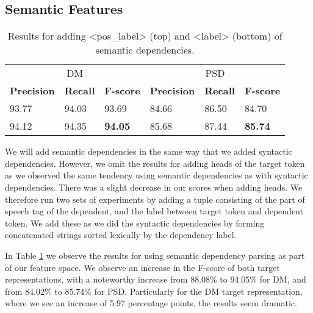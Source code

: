 

\subsection{Semantic Features}
\label{results_sem}



\begin{table}
    \centering
    \smaller[0.2]
    \begin{tabular}{@{}llllll@{}}
        \toprule
        \multicolumn{3}{c}{DM}
        & \multicolumn{3}{c}{PSD} \\
        \textbf{Precision} & \textbf{Recall} & \textbf{F-score} & \textbf{Precision} & \textbf{Recall} & \textbf{F-score} \\
        93.77 & 94.03 & 93.69 & 84.66 & 86.50 & 84.70 \\
        94.12 & 94.35 & \textbf{94.05} & 85.68 & 87.44 & \textbf{85.74} \\
        \bottomrule
    \end{tabular}
    \caption{Results for adding <pos\_label> (top) and <label> (bottom) of semantic dependencies.}
    \label{table:semantic_dependents_n}
\end{table}



We will add semantic dependencies in the same way that we added syntactic dependencies. However, we omit the results for adding heads of the target token as we observed the same tendency using semantic dependencies as with syntactic dependencies. There was a slight decrease in our scores when adding heads. We therefore run two sets of experiments by adding a tuple consisting of the part of speech tag of the dependent, and the label between target token and dependent token. We add these as we did the syntactic dependencies by forming concatenated strings sorted lexically by the dependency label.

In Table \ref{table:semantic_dependents_n} we observe the results for using semantic dependency parsing as part of our feature space. We observe an increase in the F-score of both target representations, with a noteworthy increase from 88.08\% to 94.05\% for DM, and from 84.02\% to 85.74\% for PSD. Particularly for the DM target representation, where we see an increase of 5.97 percentage points, the results seem dramatic.

